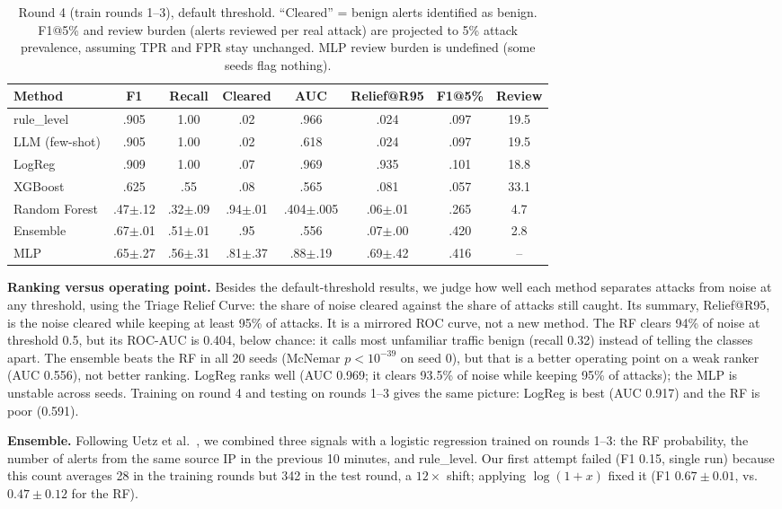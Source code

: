 \documentclass[conference]{IEEEtran}
\begin{document}
\begin{table}[t]
\centering
\caption{Round 4 (train rounds 1--3), default threshold. ``Cleared'' = benign alerts
identified as benign. F1@5\% and review burden (alerts reviewed per real attack) are projected
to 5\% attack prevalence, assuming TPR and FPR stay unchanged. MLP review burden is undefined (some seeds flag nothing).}
\label{tab:main}
\begin{tabular}{@{}lccccccc@{}}
\toprule
Method & F1 & Recall & Cleared & AUC & Relief@R95 & F1@5\% & Review \\
\midrule
rule\_level & .905 & 1.00 & .02 & .966 & .024 & .097 & 19.5 \\
LLM (few-shot) & .905 & 1.00 & .02 & .618 & .024 & .097 & 19.5 \\
LogReg & .909 & 1.00 & .07 & .969 & .935 & .101 & 18.8 \\
XGBoost & .625 & .55 & .08 & .565 & .081 & .057 & 33.1 \\
Random Forest & .47$\pm$.12 & .32$\pm$.09 & .94$\pm$.01 & .404$\pm$.005 & .06$\pm$.01 & .265 & 4.7 \\
Ensemble & .67$\pm$.01 & .51$\pm$.01 & .95 & .556 & .07$\pm$.00 & .420 & 2.8 \\
MLP & .65$\pm$.27 & .56$\pm$.31 & .81$\pm$.37 & .88$\pm$.19 & .69$\pm$.42 & .416 & -- \\
\bottomrule
\end{tabular}
\end{table}

\textbf{Ranking versus operating point.} Besides the default-threshold results, we judge how
well each method separates attacks from noise at any threshold, using the Triage Relief Curve: the
share of noise cleared against the share of attacks still caught. Its summary, Relief@R95, is the
noise cleared while keeping at least 95\% of attacks. It is a mirrored ROC curve, not a new method. The RF clears 94\% of noise at threshold 0.5, but its ROC-AUC is 0.404, below chance: it
calls most unfamiliar traffic benign (recall 0.32) instead of telling the classes apart. The
ensemble beats the RF in all 20 seeds (McNemar $p<10^{-39}$ on seed 0), but that is a better
operating point on a weak ranker (AUC 0.556), not better ranking. LogReg ranks well (AUC 0.969; it clears 93.5\% of
noise while keeping 95\% of attacks); the MLP is unstable across seeds. Training on round 4 and testing on rounds
1--3 gives the same picture: LogReg is best (AUC 0.917) and the RF is poor (0.591).

\textbf{Ensemble.} Following Uetz et al.~\cite{uetz2026}, we combined three signals with a logistic regression
trained on rounds 1--3: the RF probability, the number of alerts from the same source IP in the
previous 10 minutes, and rule\_level. Our first attempt failed (F1 0.15, single run) because this count averages 28 in the training rounds but 342
in the test round, a $12\times$ shift; applying $\log(1+x)$ fixed it (F1 $0.67\pm0.01$, vs.\ $0.47\pm0.12$ for the RF).
\end{document}
